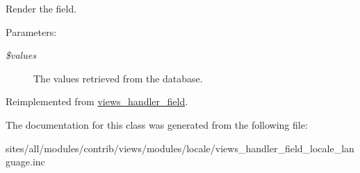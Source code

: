Render the field.

\begin{Desc}
\item[Parameters:]
\begin{description}
\item[{\em \$values}]The values retrieved from the database. \end{description}
\end{Desc}


Reimplemented from \hyperlink{classviews__handler__field_82ff951c5e9ceb97b2eab86f880cbc1e}{views\_\-handler\_\-field}.

The documentation for this class was generated from the following file:\begin{CompactItemize}
\item 
sites/all/modules/contrib/views/modules/locale/views\_\-handler\_\-field\_\-locale\_\-language.inc\end{CompactItemize}
